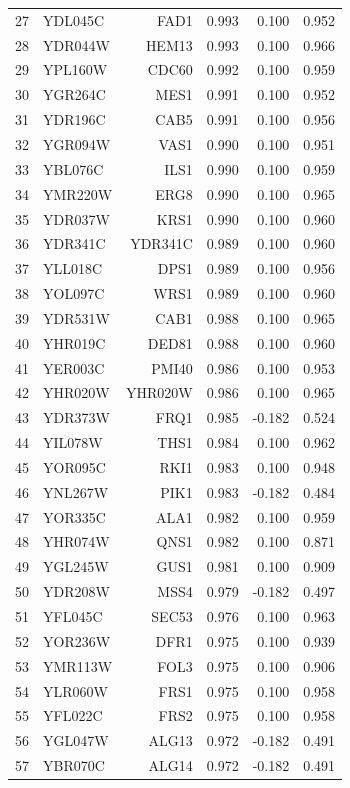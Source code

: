 \begin{longtable}{rlrrrr}
27 & YDL045C & FAD1 & 0.993 & 0.100 & 0.952\\
28 & YDR044W & HEM13 & 0.993 & 0.100 & 0.966\\
29 & YPL160W & CDC60 & 0.992 & 0.100 & 0.959\\
30 & YGR264C & MES1 & 0.991 & 0.100 & 0.952\\
31 & YDR196C & CAB5 & 0.991 & 0.100 & 0.956\\
32 & YGR094W & VAS1 & 0.990 & 0.100 & 0.951\\
33 & YBL076C & ILS1 & 0.990 & 0.100 & 0.959\\
34 & YMR220W & ERG8 & 0.990 & 0.100 & 0.965\\
35 & YDR037W & KRS1 & 0.990 & 0.100 & 0.960\\
36 & YDR341C & YDR341C & 0.989 & 0.100 & 0.960\\
37 & YLL018C & DPS1 & 0.989 & 0.100 & 0.956\\
38 & YOL097C & WRS1 & 0.989 & 0.100 & 0.960\\
39 & YDR531W & CAB1 & 0.988 & 0.100 & 0.965\\
40 & YHR019C & DED81 & 0.988 & 0.100 & 0.960\\
41 & YER003C & PMI40 & 0.986 & 0.100 & 0.953\\
42 & YHR020W & YHR020W & 0.986 & 0.100 & 0.965\\
43 & YDR373W & FRQ1 & 0.985 & -0.182 & 0.524\\
44 & YIL078W & THS1 & 0.984 & 0.100 & 0.962\\
45 & YOR095C & RKI1 & 0.983 & 0.100 & 0.948\\
46 & YNL267W & PIK1 & 0.983 & -0.182 & 0.484\\
47 & YOR335C & ALA1 & 0.982 & 0.100 & 0.959\\
48 & YHR074W & QNS1 & 0.982 & 0.100 & 0.871\\
49 & YGL245W & GUS1 & 0.981 & 0.100 & 0.909\\
50 & YDR208W & MSS4 & 0.979 & -0.182 & 0.497\\
51 & YFL045C & SEC53 & 0.976 & 0.100 & 0.963\\
52 & YOR236W & DFR1 & 0.975 & 0.100 & 0.939\\
53 & YMR113W & FOL3 & 0.975 & 0.100 & 0.906\\
54 & YLR060W & FRS1 & 0.975 & 0.100 & 0.958\\
55 & YFL022C & FRS2 & 0.975 & 0.100 & 0.958\\
56 & YGL047W & ALG13 & 0.972 & -0.182 & 0.491\\
57 & YBR070C & ALG14 & 0.972 & -0.182 & 0.491\\

\end{longtable}
